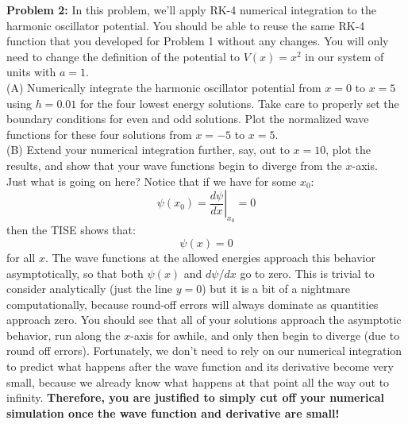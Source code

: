 \documentclass[12pt]{article}
\begin{document}
\noindent
{\bf Problem 2:}  In this problem, we'll apply RK-4 numerical integration to the harmonic oscillator potential.  You should be able to reuse the same RK-4 function that you developed for Problem 1 without any changes.  You will only need to change the definition of the potential to $V(x) = x^2$ in our system of units with $a=1$.\\[5pt]

\noindent
(A) Numerically integrate the harmonic oscillator potential from $x=0$ to $x=5$ using $h=0.01$ for the four lowest energy solutions.  Take care to properly set the boundary conditions for even and odd solutions.  Plot the normalized wave functions for these four solutions from $x=-5$ to $x=5$.\\[5pt]

\noindent
(B) Extend your numerical integration further, say, out to $x=10$, plot the results, and show that your wave functions begin to diverge from the $x$-axis.\\[5pt]

\noindent
Just what is going on here?  Notice that if we have for some $x_0$:
$$\psi(x_0) = \left.\frac{d\psi}{dx}\right\rvert_{x_0} = 0$$
then the TISE shows that:
$$\psi(x) = 0$$
for all $x$.  The wave functions at the allowed energies approach this behavior asymptotically, so that both $\psi(x)$ and $d\psi/dx$ go to zero.  This is trivial to consider analytically (just the line $y=0$) but it is a bit of a nightmare computationally, because round-off errors will always dominate as quantities approach zero.  You should see that all of your solutions approach the asymptotic behavior, run along the $x$-axis for awhile, and only then begin to diverge (due to round off errors).  Fortunately, we don't need to rely on our numerical integration to predict what happens after the wave function and its derivative become very small, because we already know what happens at that point all the way out to infinity.  {\bf Therefore, you are justified to simply cut off your numerical simulation once the wave function and derivative are small!}\\[5pt]
\end{document}
